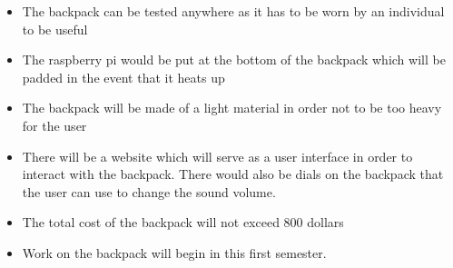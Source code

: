 
\begin{itemize}
  \item The backpack can be tested anywhere as it has to be worn by an individual to be useful
  \item The raspberry pi would be put at the bottom of the backpack which will be padded in the event that it heats up 
  \item The backpack will be made of a light material in order not to be too heavy for the user
  \item There will be a website which will serve as a user interface in order to interact with the backpack. There would also be dials on the backpack that the user can use to change the sound volume.
  \item The total cost of the backpack will not exceed 800 dollars
  \item Work on the backpack will begin in this first semester.
\end{itemize}
